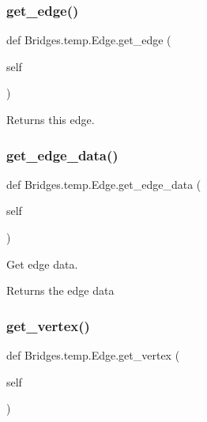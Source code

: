 \subsubsection{\texorpdfstring{get\+\_\+edge()}{get\_edge()}}
{\footnotesize\ttfamily def Bridges.\+temp.\+Edge.\+get\+\_\+edge (\begin{DoxyParamCaption}\item[{}]{self }\end{DoxyParamCaption})}



Returns this edge. 

\mbox{\label{class_bridges_1_1temp_1_1_edge_a3ac5fc36fd6372ceb17f841d8cfa4c22}} 
\subsubsection{\texorpdfstring{get\+\_\+edge\+\_\+data()}{get\_edge\_data()}}
{\footnotesize\ttfamily def Bridges.\+temp.\+Edge.\+get\+\_\+edge\+\_\+data (\begin{DoxyParamCaption}\item[{}]{self }\end{DoxyParamCaption})}



Get edge data. 

\begin{DoxyReturn}{Returns}
the edge data 
\end{DoxyReturn}
\mbox{\label{class_bridges_1_1temp_1_1_edge_a109b488c745b70c48f45b9a78d311c7a}} 
\subsubsection{\texorpdfstring{get\+\_\+vertex()}{get\_vertex()}}
{\footnotesize\ttfamily def Bridges.\+temp.\+Edge.\+get\+\_\+vertex (\begin{DoxyParamCaption}\item[{}]{self }\end{DoxyParamCaption})}



